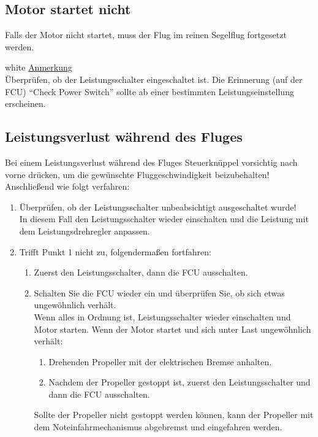 \subsection{Motor startet nicht}
Falls der Motor nicht startet, muss der Flug im reinen Segelflug fortgesetzt werden. \\

\begin{color}{white}
\large{\underline{Anmerkung}}\\
Überprüfen, ob der Leistungsschalter eingeschaltet ist. Die Erinnerung (auf der FCU) “Check Power Switch” sollte ab einer bestimmten Leistungseinstellung erscheinen.
\end{color}

\subsection{Leistungsverlust während des Fluges}

Bei einem Leistungsverlust während des Fluges Steuerknüppel vorsichtig nach vorne drücken, um die gewünschte Fluggeschwindigkeit beizubehalten! Anschließend wie folgt verfahren:

\begin{enumerate}
\item Überprüfen, ob der Leistungsschalter unbeabsichtigt ausgeschaltet wurde! \\

In diesem Fall den Leistungsschalter wieder einschalten und die Leistung mit dem
Leistungsdrehregler anpassen.\\
\item Trifft Punkt 1 nicht zu, folgendermaßen fortfahren:\\
\begin{enumerate}
\item Zuerst den Leistungsschalter, dann die FCU ausschalten. \\
\item Schalten Sie die FCU wieder ein und überprüfen Sie, ob sich etwas ungewöhnlich verhält.\\

Wenn alles in Ordnung ist, Leistungsschalter wieder einschalten und Motor starten.
Wenn der Motor startet und sich unter Last ungewöhnlich verhält:
\begin{enumerate}
\item Drehenden Propeller mit der elektrischen Bremse anhalten.
\item Nachdem der Propeller gestoppt ist, zuerst den Leistungsschalter und dann die FCU ausschalten.
\end{enumerate}

Sollte der Propeller nicht gestoppt werden können, kann der Propeller mit dem Noteinfahrmechanismus abgebremst und eingefahren werden.
\end{enumerate}
\end{enumerate}

